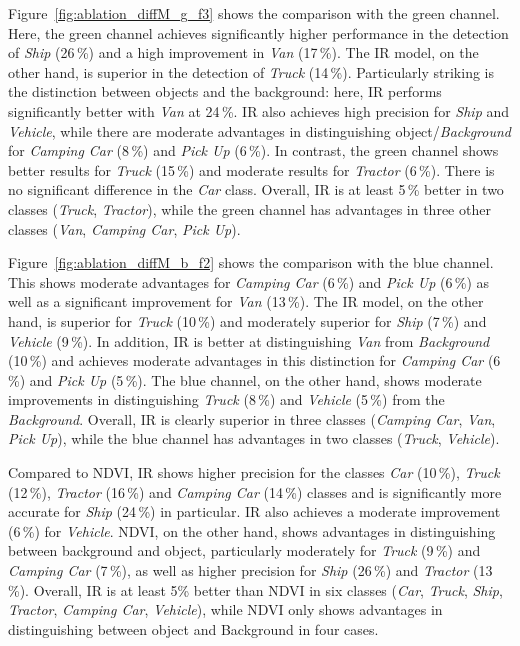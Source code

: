 Figure~\ref{fig:ablation_diffM_g_f3} shows the comparison with the green channel. Here, the green channel achieves significantly higher performance in the detection of \textit{Ship} (26\,\%) and a high improvement in \textit{Van} (17\,\%). The IR model, on the other hand, is superior in the detection of \textit{Truck} (14\,\%). Particularly striking is the distinction between objects and the background: here, IR performs significantly better with \textit{Van} at 24\,\%. IR also achieves high precision for \textit{Ship} and \textit{Vehicle}, while there are moderate advantages in distinguishing object/\textit{Background} for \textit{Camping Car} (8\,\%) and \textit{Pick Up} (6\,\%). In contrast, the green channel shows better results for \textit{Truck} (15\,\%) and moderate results for \textit{Tractor} (6\,\%). There is no significant difference in the \textit{Car} class. Overall, IR is at least 5\,\% better in two classes (\textit{Truck}, \textit{Tractor}), while the green channel has advantages in three other classes (\textit{Van}, \textit{Camping Car}, \textit{Pick Up}).

Figure~\ref{fig:ablation_diffM_b_f2} shows the comparison with the blue channel. This shows moderate advantages for \textit{Camping Car} (6\,\%) and \textit{Pick Up} (6\,\%) as well as a significant improvement for \textit{Van} (13\,\%). The IR model, on the other hand, is superior for \textit{Truck} (10\,\%) and moderately superior for \textit{Ship} (7\,\%) and \textit{Vehicle} (9\,\%). In addition, IR is better at distinguishing \textit{Van} from \textit{Background} (10\,\%) and achieves moderate advantages in this distinction for \textit{Camping Car} (6\,\%) and \textit{Pick Up} (5\,\%). The blue channel, on the other hand, shows moderate improvements in distinguishing \textit{Truck} (8\,\%) and \textit{Vehicle} (5\,\%) from the \textit{Background}. Overall, IR is clearly superior in three classes (\textit{Camping Car}, \textit{Van}, \textit{Pick Up}), while the blue channel has advantages in two classes (\textit{Truck}, \textit{Vehicle}).  

Compared to NDVI, IR shows higher precision for the classes \textit{Car} (10\,\%), \textit{Truck} (12\,\%), \textit{Tractor} (16\,\%) and \textit{Camping Car} (14\,\%) classes and is significantly more accurate for \textit{Ship} (24\,\%) in particular. IR also achieves a moderate improvement (6\,\%) for \textit{Vehicle}. NDVI, on the other hand, shows advantages in distinguishing between background and object, particularly moderately for \textit{Truck} (9\,\%) and \textit{Camping Car} (7\,\%), as well as higher precision for \textit{Ship} (26\,\%) and \textit{Tractor} (13\,\%). Overall, IR is at least 5\% better than NDVI in six classes (\textit{Car}, \textit{Truck}, \textit{Ship}, \textit{Tractor}, \textit{Camping Car}, \textit{Vehicle}), while NDVI only shows advantages in distinguishing between object and Background in four cases. 

